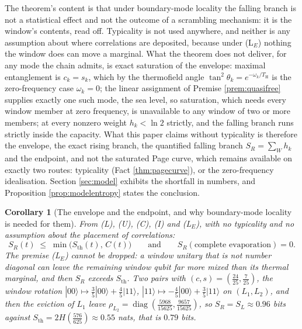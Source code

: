 \documentclass[11pt]{article}
\newtheorem{corollary}[theorem]{Corollary}
\theoremstyle{definition}
\renewcommand{\TH}{T_{\mathrm{H}}} %
\newcommand{\Sth}{S_{\mathrm{th}}}
\begin{document}
The theorem's content is that under boundary-mode locality the falling branch is not a statistical effect and not the outcome of a scrambling mechanism: it is the window's contents, read off. Typicality is not used anywhere, and neither is any assumption about where correlations are deposited, because under (L$_E$) nothing the window does can move a marginal. What the theorem does not deliver, for any mode the chain admits, is exact saturation of the envelope: maximal entanglement is $c_k = s_k$, which by the thermofield angle $\tan^{2}\theta_k = e^{-\omega_k/\TH}$ is the zero-frequency case $\omega_k = 0$; the linear assignment of Premise \ref{prem:quasifree} supplies exactly one such mode, the sea level, so saturation, which needs every window member at zero frequency, is unavailable to any window of two or more members; at every nonzero weight $h_k < \ln 2$ strictly, and the falling branch runs strictly inside the capacity. What this paper claims without typicality is therefore the envelope, the exact rising branch, the quantified falling branch $S_R = \sum_{W} h_k$ and the endpoint, and not the saturated Page curve, which remains available on exactly two routes: typicality (Fact \ref{thm:pagecurve}), or the zero-frequency idealisation. Section \ref{sec:model} exhibits the shortfall in numbers, and Proposition \ref{prop:modelentropy} states the conclusion.

\begin{corollary}[The envelope and the endpoint, and why boundary-mode locality is needed for them]\label{cor:envelope}
From (L), (U), (C), (I) and (L$_E$), with no typicality and no assumption about the placement of correlations:
\[
S_R(t) \;\leq\; \min\bigl(\Sth(t),\, C(t)\bigr) \qquad \text{and} \qquad S_R(\text{complete evaporation}) = 0 .
\]
The premise (L$_E$) cannot be dropped: a window unitary that is not number diagonal can leave the remaining window qubit far more mixed than its thermal marginal, and then $S_R$ exceeds $\Sth$. Two pairs with $(c, s) = (\tfrac{24}{25}, \tfrac{7}{25})$, the window rotation $|00\rangle \mapsto \tfrac35|00\rangle + \tfrac45|11\rangle$, $|11\rangle \mapsto -\tfrac45|00\rangle + \tfrac35|11\rangle$ on $(L_1, L_2)$, and then the eviction of $L_1$ leave $\rho_{L_2} = \operatorname{diag}(\tfrac{5968}{15625}, \tfrac{9657}{15625})$, so $S_R = S_L \approx 0.96$ bits against $\Sth = 2H(\tfrac{576}{625}) \approx 0.55$ nats, that is $0.79$ bits.
\end{corollary}
\end{document}
